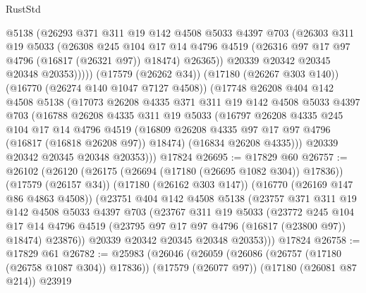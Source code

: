 \begin{lexlean}{RustStd}
\begin{coremodule}
              @5138
              (@26293
                @371
                @311
                @19
                @142
                @4508
                @5033
                @4397
                @703
                (@26303
                  @311
                  @19
                  @5033
                  (@26308
                    @245
                    @104
                    @17
                    @14
                    @4796
                    @4519
                    (@26316 @97 @17 @97 @4796 (@16817 (@26321 @97)) @18474)
                    @26365))
                @20339
                @20342
                @20345
                @20348
                @20353)))))
      (@17579 (@26262 @34))
      (@17180 (@26267 @303 @140))
      (@16770 (@26274 @140 @1047 @7127 @4508))
      (@17748
        @26208
        @404
        @142
        @4508
        @5138
        (@17073
          @26208
          @4335
          @371
          @311
          @19
          @142
          @4508
          @5033
          @4397
          @703
          (@16788
            @26208
            @4335
            @311
            @19
            @5033
            (@16797
              @26208
              @4335
              @245
              @104
              @17
              @14
              @4796
              @4519
              (@16809 @26208 @4335 @97 @17 @97 @4796 (@16817 (@16818 @26208 @97)) @18474)
              (@16834 @26208 @4335)))
          @20339
          @20342
          @20345
          @20348
          @20353)))
    @17824
@26695 := @17829 @60
@26757 := @26102
    (@26120
      (@26175 (@26694 (@17180 (@26695 @1082 @304)) @17836))
      (@17579 (@26157 @34))
      (@17180 (@26162 @303 @147))
      (@16770 (@26169 @147 @86 @4863 @4508))
      (@23751
        @404
        @142
        @4508
        @5138
        (@23757
          @371
          @311
          @19
          @142
          @4508
          @5033
          @4397
          @703
          (@23767
            @311
            @19
            @5033
            (@23772
              @245
              @104
              @17
              @14
              @4796
              @4519
              (@23795 @97 @17 @97 @4796 (@16817 (@23800 @97)) @18474)
              @23876))
          @20339
          @20342
          @20345
          @20348
          @20353)))
    @17824
@26758 := @17829 @61
@26782 := @25983
    (@26046
      (@26059
        (@26086 (@26757 (@17180 (@26758 @1087 @304)) @17836))
        (@17579 (@26077 @97))
        (@17180 (@26081 @87 @214))
        @23919

\end{coremodule}
\end{lexlean}
